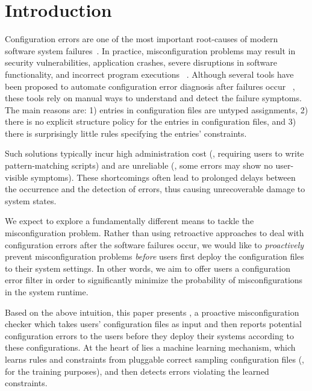 \section{Introduction}

Configuration errors are one of the most important root-causes of 
modern software system failures~\cite{xu15systems,yin11anempirical}. 
In practice, misconfiguration problems may result in 
security vulnerabilities,
application crashes, severe disruptions in software functionality,
and incorrect program executions%
~\cite{xu15systems,zhang14encore,yuan11context}.
Although several tools have been proposed to automate configuration
error diagnosis after failures occur%
~\cite{wang04automatic,attariyan10automating,%
su07autobash,whitaker04configuration}, 
these tools rely on manual ways to understand and detect the failure 
symptoms. The main reasons are:
1) entries in configuration files are untyped assignments, 
2) there is no explicit structure policy for the entries in 
configuration files, and 3) there is surprisingly little rules 
specifying the entries' constraints.

Such solutions typically incur high administration cost (\eg, 
requiring users to write pattern-matching scripts) 
and are unreliable (\eg, some errors may show no user-visible symptoms).
These shortcomings often lead to prolonged delays between
the occurrence and the detection of errors, thus causing unrecoverable
damage to system states.

We expect to explore a fundamentally different means to tackle 
the misconfiguration problem. Rather than using retroactive approaches
to deal with configuration errors after the software failures occur, 
we would like to {\em proactively} prevent misconfiguration problems 
{\em before} users first deploy the configuration files to 
their system settings. In other words, we aim to offer users 
a configuration error filter in order to significantly minimize 
the probability of misconfigurations in the system runtime.

Based on the above intuition, this paper presents \app, 
a proactive misconfiguration checker which takes users' 
configuration files as input and then reports potential configuration 
errors to the users before they deploy their systems 
according to these configurations.
At the heart of \app lies a machine learning mechanism, 
which learns rules and constraints from pluggable 
correct sampling configuration files (\ie, for the training purposes), 
and then detects errors violating the learned constraints.

